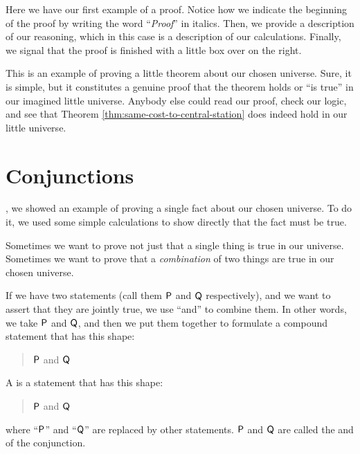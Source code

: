 \documentclass[../../../main.tex]{subfiles}
\begin{document}
Here we have our first example of a proof. Notice how we indicate the beginning of the proof by writing the word ``\emph{Proof}'' in italics. Then, we provide a description of our reasoning, which in this case is a description of our calculations. Finally, we signal that the proof is finished with a little box over on the right.

This is an example of proving a little theorem about our chosen universe. Sure, it is simple, but it constitutes a genuine proof that the theorem holds or ``is true'' in our imagined little universe. Anybody else could read our proof, check our logic, and see that Theorem \ref{thm:same-cost-to-central-station} does indeed hold in our little universe.


\section{Conjunctions}

, we showed an example of proving a single fact about our chosen universe. To do it, we used some simple calculations to show directly that the fact must be true.

Sometimes we want to prove not just that a single thing is true in our universe. Sometimes we want to prove that a \emph{combination} of two things are true in our chosen universe.

If we have two statements (call them $\P/$ and $\Q/$ respectively), and we want to assert that they are jointly true, we use ``and'' to combine them. In other words, we take $\P/$ and $\Q/$, and then we put them together to formulate a compound statement that has this shape:

\begin{quote}
  $\P/$ and $\Q/$
\end{quote}

\begin{terminology}
  A  is a statement that has this shape:
    
  \begin{quote}
    $\P/$ and $\Q/$
  \end{quote}
    
  \noindent
  where ``$\P/$'' and ``$\Q/$'' are replaced by other statements. $\P/$ and $\Q/$ are called the  and  of the conjunction.
\end{terminology}
\end{document}

